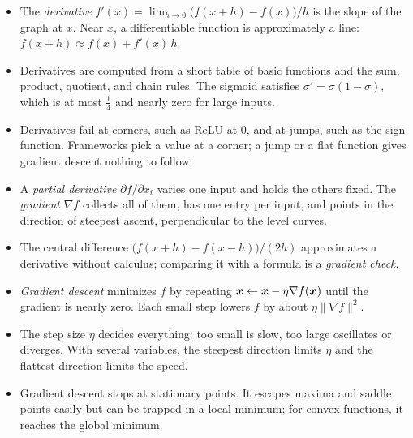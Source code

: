 \begin{itemize}
  \item The \emph{derivative} $f'(x) = \lim_{h \to 0} \bigl(f(x + h) -
    f(x)\bigr)/h$ is the slope of the graph at $x$. Near $x$, a
    differentiable function is approximately a line:
    $f(x + h) \approx f(x) + f'(x)\, h$.
  \item Derivatives are computed from a short table of basic functions and
    the sum, product, quotient, and chain rules. The sigmoid satisfies
    $\sigma' = \sigma(1 - \sigma)$, which is at most $\tfrac14$ and nearly
    zero for large inputs.
  \item Derivatives fail at corners, such as ReLU at $0$, and at jumps, such
    as the sign function. Frameworks pick a value at a corner; a jump or
    a flat function gives gradient descent nothing to follow.
  \item A \emph{partial derivative} $\partial f / \partial x_i$ varies one
    input and holds the others fixed. The \emph{gradient} $\nabla f$
    collects all of them, has one entry per input, and points in the
    direction of steepest ascent, perpendicular to the level curves.
  \item The central difference $\bigl(f(x + h) - f(x - h)\bigr)/(2h)$
    approximates a derivative without calculus; comparing it with a
    formula is a \emph{gradient check}.
  \item \emph{Gradient descent} minimizes $f$ by repeating
    $\bm{x} \leftarrow \bm{x} - \eta \nabla f(\bm{x})$ until the
    gradient is nearly zero. Each small step lowers $f$ by about
    $\eta \|\nabla f\|^2$.
  \item The step size $\eta$ decides everything: too small is slow, too
    large oscillates or diverges. With several variables, the steepest
    direction limits $\eta$ and the flattest direction limits the speed.
  \item Gradient descent stops at stationary points. It escapes maxima and
    saddle points easily but can be trapped in a local minimum; for convex
    functions, it reaches the global minimum.
\end{itemize}
